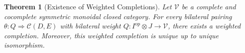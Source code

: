 \documentclass[11pt]{article}
\theoremstyle{plain}
\newtheorem{theorem}{Theorem}[section]
\theoremstyle{definition}
\theoremstyle{remark}
\newcommand{\V}{\mathcal{V}}
\newcommand{\C}{\mathcal{C}}
\newcommand{\op}{\mathrm{op}}
\begin{document}
\begin{center}
\end{center}

\begin{theorem}[Existence of Weighted Completions]\label{thm:universal-existence}
Let $\V$ be a complete and cocomplete symmetric monoidal closed category. For every bilateral pairing $\theta : Q \Rightarrow \C(D,E)$ with bilateral weight $Q : I^{\op} \otimes J \to \V$, there exists a weighted completion. Moreover, this weighted completion is unique up to unique isomorphism.
\end{theorem}
\end{document}
